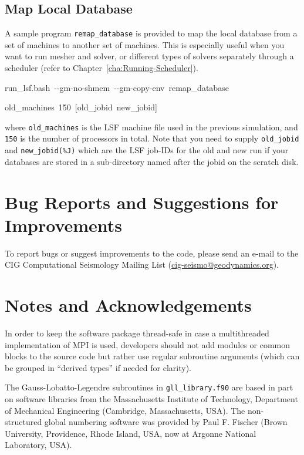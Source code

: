 \documentclass[oneside,english]{book}
\newenvironment{lyxcode}
{\begin{list}{}{
\setlength{\rightmargin}{\leftmargin}
\setlength{\listparindent}{0pt}%
\raggedright
\setlength{\itemsep}{0pt}
\setlength{\parsep}{0pt}
\normalfont\ttfamily}%
 \item[]}
{\end{list}}
\newcommand{\urlwithparentheses}[1]{(\url{#1})}
\begin{document}
\section{Map Local Database}

A sample program \texttt{remap\_database} is provided to map the local
database from a set of machines to another set of machines. This is
especially useful when you want to run mesher and solver, or different
types of solvers separately through a scheduler (refer to Chapter~\ref{cha:Running-Scheduler}).

\begin{lyxcode}
run\_lsf.bash~-{}-gm-no-shmem~-{}-gm-copy-env~remap\_database

old\_machines~150~{[}old\_jobid~new\_jobid]
\end{lyxcode}
where \texttt{old\_machines} is the LSF machine file used in the previous
simulation, and \texttt{150} is the number of processors in total.
Note that you need to supply \texttt{old\_jobid} and \texttt{new\_jobid(\%J)}
which are the LSF job-IDs for the old and new run if your databases
are stored in a sub-directory named after the jobid on the scratch
disk.


\chapter*{\label{cha:Bug-Reports-and}Bug Reports and Suggestions for Improvements}

To report bugs or suggest improvements to the code, please send an
e-mail to the CIG Computational Seismology Mailing List \urlwithparentheses{cig-seismo@geodynamics.org}.

\chapter*{\label{cha:Notes-and-Acknowledgements}Notes and Acknowledgements}

In order to keep the software package thread-safe in case a multithreaded
implementation of MPI is used, developers should not add modules or
common blocks to the source code but rather use regular subroutine
arguments (which can be grouped in ``derived types'' if needed for
clarity).

The Gauss-Lobatto-Legendre subroutines in \texttt{gll\_library.f90}
are based in part on software libraries from the Massachusetts Institute
of Technology, Department of Mechanical Engineering (Cambridge, Massachusetts, USA).
The non-structured global numbering software was provided by Paul
F. Fischer (Brown University, Providence, Rhode Island, USA, now at Argonne National Laboratory, USA).
\end{document}

